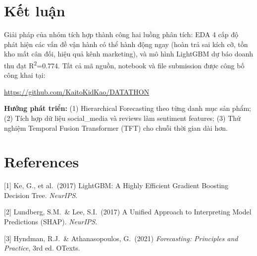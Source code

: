 \documentclass{article}
\begin{document}
\section{Kết luận}

Giải pháp của nhóm tích hợp thành công hai luồng phân tích: EDA 4 cấp độ phát hiện các vấn đề vận hành có thể hành động ngay (hoàn trả sai kích cỡ, tồn kho mất cân đối, hiệu quả kênh marketing), và mô hình LightGBM dự báo doanh thu đạt R\textsuperscript{2}=0.774. Tất cả mã nguồn, notebook và file submission được công bố công khai tại:

\begin{center}
\url{https://github.com/KaitoKidKao/DATATHON}
\end{center}

\textbf{Hướng phát triển:} (1) Hierarchical Forecasting theo từng danh mục sản phẩm; (2) Tích hợp dữ liệu social\_media và reviews làm sentiment features; (3) Thử nghiệm Temporal Fusion Transformer (TFT) cho chuỗi thời gian dài hơn.

\section*{References}

{\small
[1] Ke, G., et al.\ (2017) LightGBM: A Highly Efficient Gradient Boosting Decision Tree. \textit{NeurIPS}.

[2] Lundberg, S.M.\ \& Lee, S.I.\ (2017) A Unified Approach to Interpreting Model Predictions (SHAP). \textit{NeurIPS}.

[3] Hyndman, R.J.\ \& Athanasopoulos, G.\ (2021) \textit{Forecasting: Principles and Practice}, 3rd ed. OTexts.
}
\end{document}
